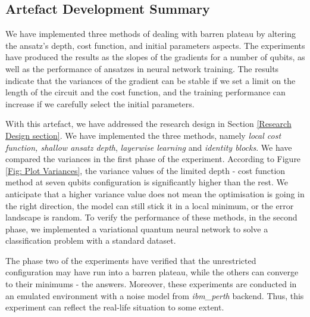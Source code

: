 \subsection{Artefact Development Summary}

We have implemented three methods of dealing with barren plateau by altering the ansatz's depth, cost function, and initial parameters aspects.
The experiments have produced the results as the slopes of the gradients for a number of qubits, as well as the performance of ansatzes in neural network training.
The results indicate that the variances of the gradient can be stable if we set a limit on the length of the circuit and the cost function, and the training performance can increase if we carefully select the initial parameters.

With this artefact, we have addressed the research design in Section \ref{Research Design section}.
We have implemented the three methods, namely \textit{local cost function, shallow ansatz depth}, \textit{layerwise learning} and \textit{identity blocks}.
We have compared the variances in the first phase of the experiment.
According to Figure \ref{Fig: Plot Variances}, the variance values of the limited depth - cost function method at seven qubits configuration is significantly higher than the rest.
We anticipate that a higher variance value does not mean the optimisation is going in the right direction, the model can still stick it in a local minimum, or the error landscape is random.
To verify the performance of these methods, in the second phase, we implemented a variational quantum neural network to solve a classification problem with a standard dataset.

The phase two of the experiments have verified that the unrestricted configuration may have run into a barren plateau, while the others can converge to their minimums - the answers.
Moreover, these experiments are conducted in an emulated environment with a noise model from \emph{ibm\_perth} backend.
Thus, this experiment can reflect the real-life situation to some extent.

